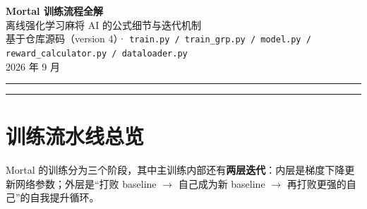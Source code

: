\documentclass[11pt,a4paper]{ctexart}
\theoremstyle{remark}
\begin{document}
\begin{center}
  {\LARGE\bfseries\color{nv} Mortal 训练流程全解}\\[6pt]
  {\Large 离线强化学习麻将 AI 的公式细节与迭代机制}\\[8pt]
  {\small\color{notegray} 基于仓库源码（version 4）· \texttt{train.py / train\_grp.py / model.py / reward\_calculator.py / dataloader.py}\\
   2026 年 9 月}
\end{center}

\vspace{4pt}
\hrule
\vspace{8pt}

{\small\tableofcontents}
\vspace{6pt}
\hrule

\section{训练流水线总览}

Mortal 的训练分为三个阶段，其中主训练内部还有\textbf{两层迭代}：内层是梯度下降更新网络参数；外层是``打败 baseline $\to$ 自己成为新 baseline $\to$ 再打败更强的自己''的自我提升循环。
\end{document}
